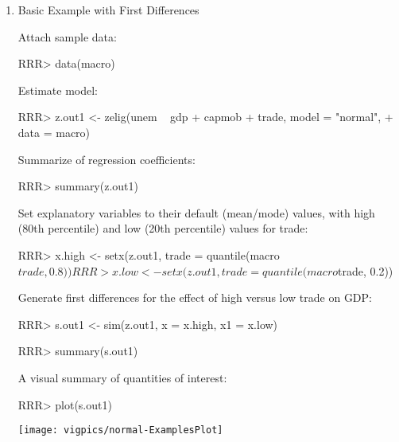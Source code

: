 \begin{enumerate}
\item Basic Example with First Differences

Attach sample data: 
\begin{Schunk}
\begin{Sinput}
RRR>  data(macro)
\end{Sinput}
\end{Schunk}
Estimate model:  
\begin{Schunk}
\begin{Sinput}
RRR>  z.out1 <- zelig(unem ~ gdp + capmob + trade, model = "normal", 
+                   data = macro)
\end{Sinput}
\end{Schunk}
Summarize of regression coefficients:  
\begin{Schunk}
\begin{Sinput}
RRR>  summary(z.out1)
\end{Sinput}
\end{Schunk}
Set explanatory variables to their default (mean/mode) values, with
high (80th percentile) and low (20th percentile) values for trade: 
\begin{Schunk}
\begin{Sinput}
RRR>  x.high <- setx(z.out1, trade = quantile(macro$trade, 0.8))
RRR>  x.low <- setx(z.out1, trade = quantile(macro$trade, 0.2))
\end{Sinput}
\end{Schunk}
Generate first differences for the effect of high versus low trade on
GDP: 
\begin{Schunk}
\begin{Sinput}
RRR>  s.out1 <- sim(z.out1, x = x.high, x1 = x.low)
\end{Sinput}
\end{Schunk}
\begin{Schunk}
\begin{Sinput}
RRR>  summary(s.out1)
\end{Sinput}
\end{Schunk}
A visual summary of quantities of interest:  
\begin{center}
\begin{Schunk}
\begin{Sinput}
RRR>  plot(s.out1)
\end{Sinput}
\end{Schunk}
\texttt{[image: vigpics/normal-ExamplesPlot]}
\end{center}


\end{enumerate}
